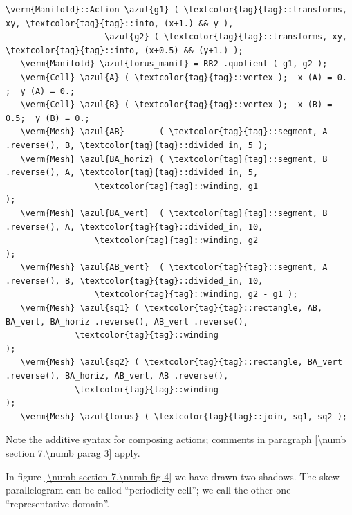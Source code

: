 \begin{Verbatim}[commandchars=\\\{\},formatcom=\small\tt,frame=single,
   label=parag-\ref{\numb section 7.\numb parag 8}.cpp,rulecolor=\color{coment},
   baselinestretch=0.94,framesep=2mm                                            ]
   \verm{Manifold}::Action \azul{g1} ( \textcolor{tag}{tag}::transforms, xy, \textcolor{tag}{tag}::into, (x+1.) && y ),
                    \azul{g2} ( \textcolor{tag}{tag}::transforms, xy, \textcolor{tag}{tag}::into, (x+0.5) && (y+1.) );
   \verm{Manifold} \azul{torus_manif} = RR2 .quotient ( g1, g2 );
   \verm{Cell} \azul{A} ( \textcolor{tag}{tag}::vertex );  x (A) = 0. ;  y (A) = 0.;
   \verm{Cell} \azul{B} ( \textcolor{tag}{tag}::vertex );  x (B) = 0.5;  y (B) = 0.;
   \verm{Mesh} \azul{AB}       ( \textcolor{tag}{tag}::segment, A .reverse(), B, \textcolor{tag}{tag}::divided_in, 5 );
   \verm{Mesh} \azul{BA_horiz} ( \textcolor{tag}{tag}::segment, B .reverse(), A, \textcolor{tag}{tag}::divided_in, 5,
                  \textcolor{tag}{tag}::winding, g1                                  );
   \verm{Mesh} \azul{BA_vert}  ( \textcolor{tag}{tag}::segment, B .reverse(), A, \textcolor{tag}{tag}::divided_in, 10,
                  \textcolor{tag}{tag}::winding, g2                                  );
   \verm{Mesh} \azul{AB_vert}  ( \textcolor{tag}{tag}::segment, A .reverse(), B, \textcolor{tag}{tag}::divided_in, 10,
                  \textcolor{tag}{tag}::winding, g2 - g1 );
   \verm{Mesh} \azul{sq1} ( \textcolor{tag}{tag}::rectangle, AB, BA_vert, BA_horiz .reverse(), AB_vert .reverse(),
              \textcolor{tag}{tag}::winding                                                        );
   \verm{Mesh} \azul{sq2} ( \textcolor{tag}{tag}::rectangle, BA_vert .reverse(), BA_horiz, AB_vert, AB .reverse(),
              \textcolor{tag}{tag}::winding                                                        );
   \verm{Mesh} \azul{torus} ( \textcolor{tag}{tag}::join, sq1, sq2 );
\end{Verbatim}

Note the additive syntax for composing actions; comments in paragraph
\ref{\numb section 7.\numb parag 3} apply.

In figure \ref{\numb section 7.\numb fig 4} we have drawn two shadows.
The skew parallelogram can be called ``periodicity cell'';
we call the other one ``representative domain''.

